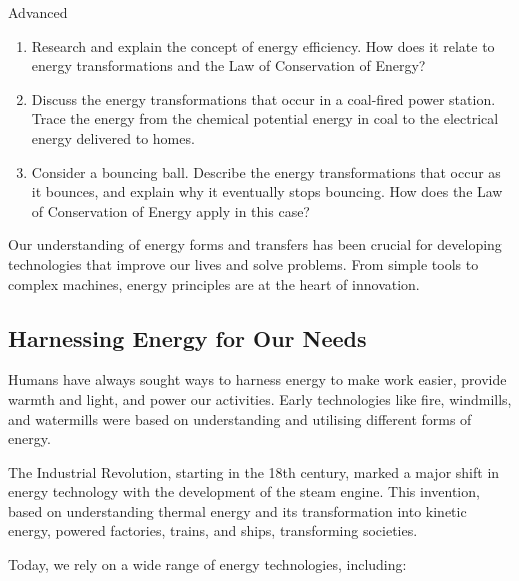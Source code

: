 \begin{marginnote}
\begin{tieredquestions}{Advanced}
\begin{enumerate}
    \item Research and explain the concept of energy efficiency. How does it relate to energy transformations and the Law of Conservation of Energy?
    \item Discuss the energy transformations that occur in a coal-fired power station.  Trace the energy from the chemical potential energy in coal to the electrical energy delivered to homes.
    \item Consider a bouncing ball.  Describe the energy transformations that occur as it bounces, and explain why it eventually stops bouncing.  How does the Law of Conservation of Energy apply in this case?
\end{enumerate}
\end{tieredquestions}


\FloatBarrier
\1

Our understanding of energy forms and transfers has been crucial for developing technologies that improve our lives and solve problems.  From simple tools to complex machines, energy principles are at the heart of innovation.

\subsection{Harnessing Energy for Our Needs}

Humans have always sought ways to harness energy to make work easier, provide warmth and light, and power our activities.  Early technologies like fire, windmills, and watermills were based on understanding and utilising different forms of energy.


The Industrial Revolution, starting in the 18th century, marked a major shift in energy technology with the development of the steam engine.  This invention, based on understanding thermal energy and its transformation into kinetic energy, powered factories, trains, and ships, transforming societies.

Today, we rely on a wide range of energy technologies, including:


\end{marginnote}
